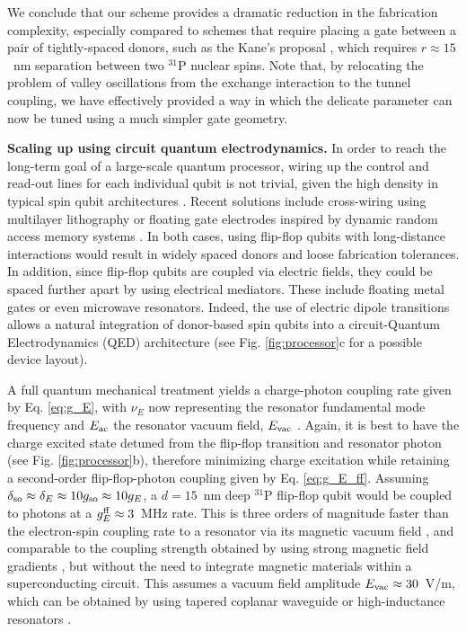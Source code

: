 \documentclass[aps,prb,superscriptaddress,nobibnotes,preprint]{revtex4-1}%
\begin{document}
We conclude that our scheme provides a dramatic reduction in the fabrication complexity, especially compared to schemes that require placing a gate between a pair of tightly-spaced donors, such as the Kane's proposal \cite{Kane1998}, which requires $r\approx15$~nm separation between two $^{31}$P nuclear spins. Note that, by relocating the problem of valley oscillations from the exchange interaction \cite{Kane1998} to the tunnel coupling, we have effectively provided a way in which the delicate parameter can now be tuned using a much simpler gate geometry.


\vspace{3mm}
\noindent\textbf{Scaling up using circuit quantum electrodynamics.}
%
In order to reach the long-term goal of a large-scale quantum processor, wiring up the control and read-out lines for each individual qubit is not trivial, given the high density in typical spin qubit architectures \cite{Vandersypen2016}. Recent solutions include cross-wiring using multilayer lithography \cite{Hill2015} or floating gate electrodes inspired by dynamic random access memory systems \cite{Veldhorst2016}. In both cases, using flip-flop qubits with long-distance interactions would result in widely spaced donors and loose fabrication tolerances. In addition, since flip-flop qubits are coupled via electric fields, they could be spaced further apart by using electrical mediators. These include floating metal gates \cite{Trifunovic2012} or even microwave resonators. Indeed, the use of electric dipole transitions allows a natural integration of donor-based spin qubits into a circuit-Quantum Electrodynamics (QED) architecture \cite{Blais2004,Childress2004,Xiang2013,Mi2016} (see Fig. \ref{fig:processor}c for a possible device layout).

A full quantum mechanical treatment yields a charge-photon coupling rate given by Eq. \ref{eq:g_E}, with $\nu_E$ now representing the resonator fundamental mode frequency and $E_{\rm ac}$ the resonator vacuum field, $E_{\rm vac}$ . Again, it is best to have the charge excited state detuned from the flip-flop transition and resonator photon (see Fig. \ref{fig:processor}b), therefore minimizing charge excitation while retaining a second-order flip-flop-photon coupling given by Eq. \ref{eq:g_E_ff}. Assuming $\delta_{\rm so}\approx\delta_E\approx 10g_{\rm so}\approx 10g_E$, a $d=15$~nm deep $^{31}$P flip-flop qubit would be coupled to photons at a $g^{\rm ff}_E\approx3$~MHz rate. This is three orders of magnitude faster than the electron-spin coupling rate to a resonator via its magnetic vacuum field \cite{Tosi2014,Haikka2017}, and comparable to the coupling strength obtained by using strong magnetic field gradients \cite{Hu2012,Viennot2015}, but without the need to integrate magnetic materials within a superconducting circuit. This assumes a vacuum field amplitude $E_{\rm vac}\approx 30$~V/m, which can be obtained by using tapered coplanar waveguide or high-inductance resonators \cite{Samkharadze2016}.
\end{document}
